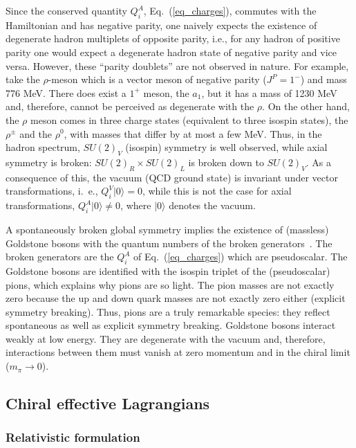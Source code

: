 \documentclass[sort&compress,preprint,3p]{elsarticle}
\begin{document}
Since the conserved quantity $Q^A_i$, Eq.~(\ref{eq_charges}),
commutes with the Hamiltonian and has negative parity,
one naively expects the existence of degenerate hadron
multiplets of opposite parity, i.e., for any hadron of positive
parity one would expect a degenerate hadron state of negative 
parity and vice versa. However, these ``parity doublets'' are
not observed in nature. For example, take the $\rho$-meson which is
a vector meson of negative parity ($J^P=1^-$) and mass 
776 MeV. There does exist a $1^+$ meson, the $a_1$, but it
has a mass of 1230 MeV and, therefore, cannot be perceived
as degenerate with the $\rho$. On the other hand, the $\rho$
meson comes in three charge states (equivalent to
three isospin states), the $\rho^\pm$ and the $\rho^0$,
with masses that differ by at most a few MeV. Thus,
in the hadron spectrum,
$SU(2)_V$ (isospin) symmetry is well observed,
while axial symmetry is broken:
$SU(2)_R\times SU(2)_L$ is broken down to $SU(2)_V$.
As a consequence of this,
the vacuum (QCD ground state) is invariant under 
vector transformations, i.~e., $Q^V_i|0\rangle = 0$, while this is not the case for axial
transformations, 
$Q^A_i|0\rangle \neq 0$,
where $|0\rangle$ denotes the vacuum.

A spontaneously broken global symmetry implies the existence
of (massless) Goldstone bosons with the quantum numbers
of the broken generators~\cite{Gol61,GSW62}. The broken generators are the $Q^A_i$
of Eq.~(\ref{eq_charges}) which are pseudoscalar.
The Goldstone bosons are identified with the isospin
triplet of the (pseudoscalar) pions, 
which explains why pions are so light.
The pion masses are not exactly zero because the up
and down quark masses
are not exactly zero either (explicit symmetry breaking).
Thus, pions are a truly remarkable species:
they reflect spontaneous as well as explicit symmetry
breaking.
Goldstone bosons interact weakly at low energy.
They are degenerate with the vacuum 
and, therefore, interactions between them must
vanish at zero momentum and in the chiral limit
($m_\pi \rightarrow 0$).


\subsection{Chiral effective Lagrangians 
\label{sec_Lpi} }

\subsubsection{Relativistic formulation}
\end{document}
